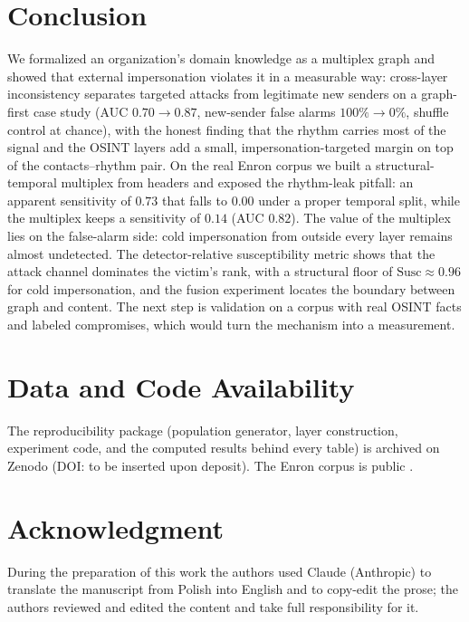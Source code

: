 \documentclass[conference]{IEEEtran}
\newif\ifanon
\begin{document}
\section{Conclusion}
\label{sec:conclusion}
We formalized an organization's domain knowledge as a multiplex graph and showed that external impersonation
violates it in a measurable way: cross-layer inconsistency separates targeted attacks from legitimate new
senders on a graph-first case study (AUC $0.70\!\to\!0.87$, new-sender false alarms $100\%\!\to\!0\%$, shuffle
control at chance), with the honest finding that the rhythm carries most of the signal and the OSINT layers
add a small, impersonation-targeted margin on top of the contacts--rhythm pair. On the real Enron
corpus we built a structural-temporal multiplex from headers and exposed the rhythm-leak pitfall: an apparent
sensitivity of $0.73$ that falls to $0.00$ under a proper temporal split, while the multiplex keeps a sensitivity of $0.14$ (AUC $0.82$).
The value of the multiplex lies on the false-alarm side: cold impersonation from outside every layer remains
almost undetected. The detector-relative susceptibility metric shows that the attack channel dominates the
victim's rank, with a structural floor of $\mathrm{Susc}\approx0.96$ for cold impersonation, and the fusion
experiment locates the boundary between graph and content. The next step is validation on a corpus with real OSINT facts and labeled compromises,
which would turn the mechanism into a measurement.

\section*{Data and Code Availability}
\ifanon
The reproducibility package (population generator, layer construction, experiment code, and the computed
results behind every table) will be released upon acceptance. The Enron corpus is public
\cite{klimt2004enron}.
\else
The reproducibility package (population generator, layer construction, experiment code, and the computed
results behind every table) is archived on Zenodo (DOI: to be inserted upon deposit). The Enron corpus is
public \cite{klimt2004enron}.
\fi

\ifanon\else
\section*{Acknowledgment}
During the preparation of this work the authors used Claude (Anthropic) to translate the manuscript from
Polish into English and to copy-edit the prose; the authors reviewed and edited the content and take full
responsibility for it.
\fi



\end{document}
